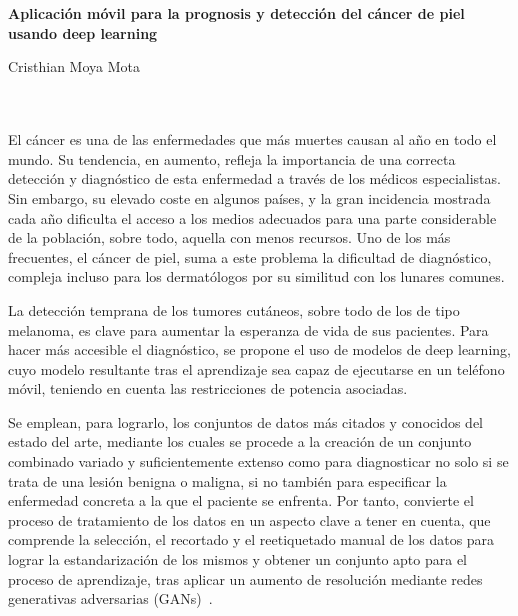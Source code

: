\chapter*{}






\cleardoublepage
\thispagestyle{empty}

\begin{center}
{\large\bfseries Aplicación móvil para la prognosis y detección del cáncer de piel usando deep learning}\\
\end{center}
\begin{center}
Cristhian Moya Mota\\
\end{center}

\\

\vspace{0.7cm}
\\

El cáncer es una de las enfermedades que más muertes causan al año en todo el mundo. Su tendencia, en aumento, refleja la importancia de una correcta detección y diagnóstico de esta enfermedad a través de los médicos especialistas. Sin embargo, su elevado coste en algunos países, y la gran incidencia mostrada cada año dificulta el acceso a los medios adecuados para una parte considerable de la población, sobre todo, aquella con menos recursos. Uno de los más frecuentes, el cáncer de piel, suma a este problema la dificultad de diagnóstico, compleja incluso para los dermatólogos por su similitud con los lunares comunes.

La detección temprana de los tumores cutáneos, sobre todo de los de tipo melanoma, es clave para aumentar la esperanza de vida de sus pacientes. Para hacer más accesible el diagnóstico, se propone el uso de modelos de deep learning, cuyo modelo resultante tras el aprendizaje sea capaz de ejecutarse en un teléfono móvil, teniendo en cuenta las restricciones de potencia asociadas.

Se emplean, para lograrlo, los conjuntos de datos más citados y conocidos del estado del arte, mediante los cuales se procede a la creación de un conjunto combinado variado y suficientemente extenso como para diagnosticar no solo si se trata de una lesión benigna o maligna, si no también para especificar la enfermedad concreta a la que el paciente se enfrenta. Por tanto, convierte el proceso de tratamiento de los datos en un aspecto clave a tener en cuenta, que comprende la selección, el recortado y el reetiquetado manual de los datos para lograr la estandarización de los mismos y obtener un conjunto apto para el proceso de aprendizaje, tras aplicar un aumento de resolución mediante redes generativas adversarias (GANs)~\cite{goodfellow2014generative}.

